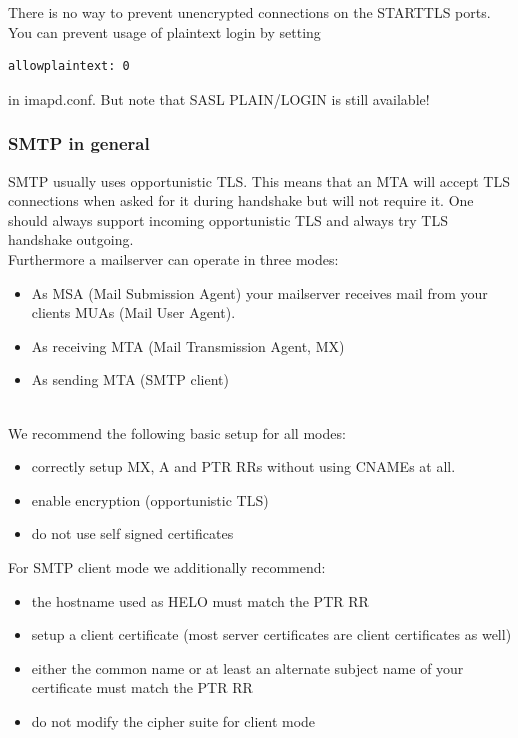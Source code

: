 There is no way to prevent unencrypted connections on the STARTTLS ports. You can prevent usage of plaintext login by setting
\begin{lstlisting}[breaklines]
  allowplaintext: 0
\end{lstlisting}
in imapd.conf. But note that SASL PLAIN/LOGIN is still available!\\





\subsubsection{SMTP in general}

SMTP usually uses opportunistic TLS. This means that an MTA will accept TLS connections when asked for it during handshake but will not require it. One should always support incoming opportunistic TLS and always try TLS handshake outgoing.\\

Furthermore a mailserver can operate in three modes:
\begin{itemize}
\item As MSA (Mail Submission Agent) your mailserver receives mail from your clients MUAs (Mail User Agent).
\item As receiving MTA (Mail Transmission Agent, MX)
\item As sending MTA (SMTP client)
\end{itemize}
\mbox{}\\
We recommend the following basic setup for all modes:
\begin{itemize}
\item correctly setup MX, A and PTR RRs without using CNAMEs at all.
\item enable encryption (opportunistic TLS)
\item do not use self signed certificates
\end{itemize}

For SMTP client mode we additionally recommend:
\begin{itemize}
\item the hostname used as HELO must match the PTR RR
\item setup a client certificate (most server certificates are client certificates as well)
\item either the common name or at least an alternate subject name of your certificate must match the PTR RR
\item do not modify the cipher suite for client mode
\end{itemize}

